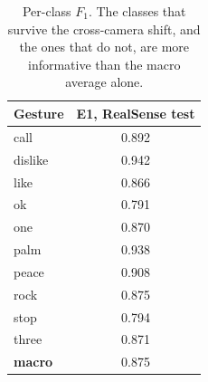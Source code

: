 \begin{table}[t]
\centering
\caption{Per-class $F_1$. The classes that survive the cross-camera shift, and the ones that do not, are more informative than the macro average alone.}
\label{tab:perclass}
\begin{tabular}{lc}
\toprule
Gesture & E1, RealSense test \\
\midrule
call & 0.892 \\
dislike & 0.942 \\
like & 0.866 \\
ok & 0.791 \\
one & 0.870 \\
palm & 0.938 \\
peace & 0.908 \\
rock & 0.875 \\
stop & 0.794 \\
three & 0.871 \\
\midrule
\textbf{macro} & 0.875 \\
\bottomrule
\end{tabular}
\end{table}
